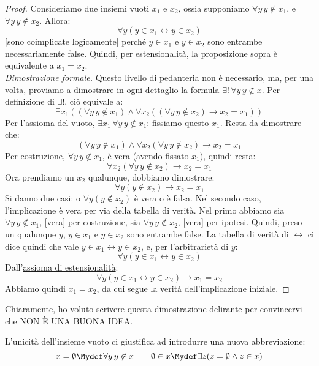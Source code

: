 \documentclass[11pt]{scrartcl}
\begin{document}
\begin{proof}
Consideriamo due insiemi vuoti $x_1$ e $x_2$, ossia supponiamo $\forall y \, y \not\in x_1$, e $\forall y \, y \not \in x_2$. Allora:
\[ \forall y (y \in x_1 \leftrightarrow y \in x_2)
	\]
[sono coimplicate logicamente] perché $y \in x_1$ e $y \in x_2$ sono entrambe necessariamente false. Quindi, per \hyperref[ax2]{estensionalità}, la proposizione sopra è equivalente a $x_1 = x_2$.\\
\emph{Dimostrazione formale.} Questo livello di pedanteria non è necessario, ma, per una volta, proviamo a dimostrare in ogni dettaglio la formula $\exists ! \, \forall y \, y \not\in x$. Per definizione di $\exists !$, ciò equivale a:
\[ \exists x_1 ((\forall y \, y \not \in x_1) \land \forall x_2 ((\forall y \, y \not \in x_2) \rightarrow x_2 = x_1))
	\]
Per l'\hyperref[ax1]{assioma del vuoto}, $\exists x_1 \, \forall y \, y \not \in x_1$: fissiamo questo $x_1$. Resta da dimostrare che:
\[ (\forall y \, y \not \in x_1) \land \forall x_2(\forall y \, y \not \in x_2) \rightarrow x_2 = x_1
	\]
Per costruzione, $\forall y \, y \not\in x_1$, è vera (avendo fissato $x_1$), quindi resta:
\[ \forall x_2 (\forall y \, y \not \in x_2) \rightarrow x_2 = x_1
	\]
Ora prendiamo un $x_2$ qualunque, dobbiamo dimostrare:
\[ \forall y (y \not \in x_2) \rightarrow x_2 = x_1
	\]
Si danno due casi: o $\forall y (y \not \in x_2)$ è vera o è falsa. Nel secondo caso, l'implicazione è vera per via della tabella di verità. Nel primo abbiamo sia $\forall y \, y \not \in x_1$, [vera] per
costruzione, sia $\forall y \, y \not \in x_2$, [vera] per ipotesi. Quindi, preso un qualunque $y$, $y \in x_1$ e $y \in x_2$ sono entrambe false. La tabella di verità di $\leftrightarrow$ ci dice quindi che vale $y \in x_1 \leftrightarrow y \in x_2$, e, per 
l'arbitrarietà di $y$:
\[ \forall y (y \in x_1 \leftrightarrow y \in x_2)
	\]
Dall'\hyperref[ax2]{assioma di estensionalità}:
\[ \forall y (y \in x_1 \leftrightarrow y \in x_2) \rightarrow x_1 = x_2
	\]
Abbiamo quindi $x_1 = x_2$, da cui segue la verità dell'implicazione iniziale.
\end{proof}

Chiaramente, ho voluto scrivere questa dimostrazione delirante per convincervi che NON È UNA BUONA IDEA.

\begin{notation}
L'unicità dell'insieme vuoto ci giustifica ad introdurre una nuova abbreviazione:
\[ x = \emptyset \Mydef \forall y \, y \not\in x \qquad \emptyset \in x \Mydef \exists z (z = \emptyset \land z \in x)
	\]
\end{notation}
\end{document}
